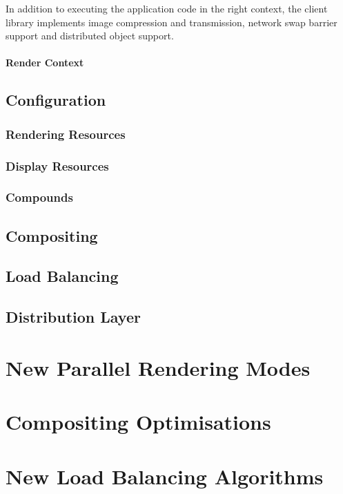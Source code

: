 In addition to executing the application code in the right context, the
client library implements image compression and transmission, network
swap barrier support and distributed object support.

\subsubsection{Render Context}

\section{Configuration}
\subsection{Rendering Resources}
\subsection{Display Resources}
\subsection{Compounds}

\section{Compositing}

\section{Load Balancing}

\section{Distribution Layer}


\chapter{New Parallel Rendering Modes}


\chapter{Compositing Optimisations}


\chapter{New Load Balancing Algorithms}


